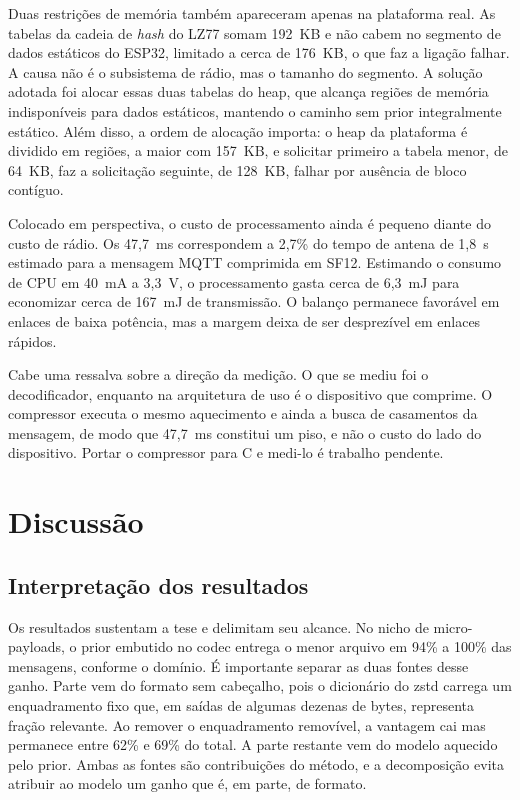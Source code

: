\documentclass[12pt]{article}
\begin{document}
Duas restrições de memória também apareceram apenas na plataforma real. As
tabelas da cadeia de \textit{hash} do LZ77 somam 192~KB e não cabem no segmento
de dados estáticos do ESP32, limitado a cerca de 176~KB, o que faz a ligação
falhar. A causa não é o subsistema de rádio, mas o tamanho do segmento. A
solução adotada foi alocar essas duas tabelas do heap, que alcança regiões de
memória indisponíveis para dados estáticos, mantendo o caminho sem prior
integralmente estático. Além disso, a ordem de alocação importa: o heap da
plataforma é dividido em regiões, a maior com 157~KB, e solicitar primeiro a
tabela menor, de 64~KB, faz a solicitação seguinte, de 128~KB, falhar por
ausência de bloco contíguo.

Colocado em perspectiva, o custo de processamento ainda é pequeno diante do
custo de rádio. Os 47,7~ms correspondem a 2,7\% do tempo de antena de 1,8~s
estimado para a mensagem MQTT comprimida em SF12. Estimando o consumo de CPU em
40~mA a 3,3~V, o processamento gasta cerca de 6,3~mJ para economizar cerca de
167~mJ de transmissão. O balanço permanece favorável em enlaces de baixa
potência, mas a margem deixa de ser desprezível em enlaces rápidos.

Cabe uma ressalva sobre a direção da medição. O que se mediu foi o
decodificador, enquanto na arquitetura de uso é o dispositivo que comprime. O
compressor executa o mesmo aquecimento e ainda a busca de casamentos da
mensagem, de modo que 47,7~ms constitui um piso, e não o custo do lado do
dispositivo. Portar o compressor para C e medi-lo é trabalho pendente.

\section{Discussão}
\label{sec:discussao}

\subsection{Interpretação dos resultados}

Os resultados sustentam a tese e delimitam seu alcance. No nicho de
micro-payloads, o prior embutido no codec entrega o menor arquivo em 94\% a
100\% das mensagens, conforme o domínio. É importante separar as duas fontes
desse ganho. Parte vem do formato sem cabeçalho, pois o dicionário do zstd
carrega um enquadramento fixo que, em saídas de algumas dezenas de bytes,
representa fração relevante. Ao remover o enquadramento removível, a vantagem
cai mas permanece entre 62\% e 69\% do total. A parte restante vem do modelo
aquecido pelo prior. Ambas as fontes são contribuições do método, e a
decomposição evita atribuir ao modelo um ganho que é, em parte, de formato.
\end{document}
